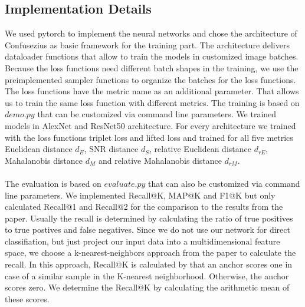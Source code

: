 \documentclass[12pt,paper=a4]{scrartcl}
\theoremstyle{break}
\begin{document}
\subsection{Implementation Details}
We used pytorch to implement the neural networks and chose the architecture of Confusezius as basic framework for the training part. The architecture delivers dataloader functions that allow to train the models in customized image batches. Because the loss functions need different batch shapes in the training, we use the preimplemented sampler functions to organize the batches for the loss functions. The loss functions have the metric name as an additional parameter. That allows us to train the same loss function with different metrics. The training is based on $demo.py$ that can be customized via command line parameters. We trained models in AlexNet and ResNet50 architecture. For every architecture we trained with the loss functions triplet loss and lifted loss and trained for all five metrics Euclidean distance $d_E$, SNR distance $d_S$, relative Euclidean distance $d_{rE}$, Mahalanobis distance $d_M$ and relative Mahalanobis distance $d_{rM}$. \\ \\
The evaluation is based on $evaluate.py$ that can also be customized via command line parameters. We implemented Recall@K, MAP@K and F1@K but only calculated Recall@1 and Recall@2 for the comparison to the results from the paper. Usually the recall is determined by calculating the ratio of true positives to true postives and false negatives. Since we do not use our network for direct classifiation, but just project our input data into a multidimensional feature space, we choose a k-nearest-neighbors approach from the paper to calculate the recall. In this approach, Recall@K is calculated by that an anchor scores one in case of a similar sample in the K-nearest neighborhood. Otherwise, the anchor scores zero. We determine the Recall@K by calculating the arithmetic mean of these scores.
\end{document}
